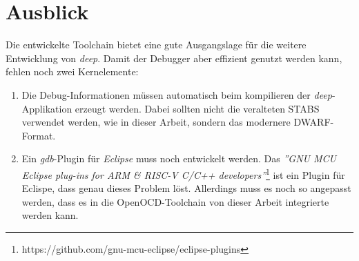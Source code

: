\section{Ausblick}
Die entwickelte Toolchain bietet eine gute Ausgangslage für die weitere Entwicklung von \textit{deep}.
Damit der Debugger aber effizient genutzt werden kann, fehlen noch zwei Kernelemente:
\begin{enumerate}
	\item Die Debug-Informationen müssen automatisch beim kompilieren der \textit{deep}-Applikation erzeugt werden.
		  Dabei sollten nicht die veralteten STABS verwendet werden, wie in dieser Arbeit, sondern das modernere DWARF-Format.
	\item Ein \textit{gdb}-Plugin für \textit{Eclipse} muss noch entwickelt werden.
		  Das \textit{''GNU MCU Eclipse plug-ins for ARM \& RISC-V C/C++ developers''}\footnote{https://github.com/gnu-mcu-eclipse/eclipse-plugins} ist ein Plugin für Eclispe, dass genau dieses Problem löst.
		  Allerdings muss es noch so angepasst werden, dass es in die OpenOCD-Toolchain von dieser Arbeit integrierte werden kann.
\end{enumerate}















































